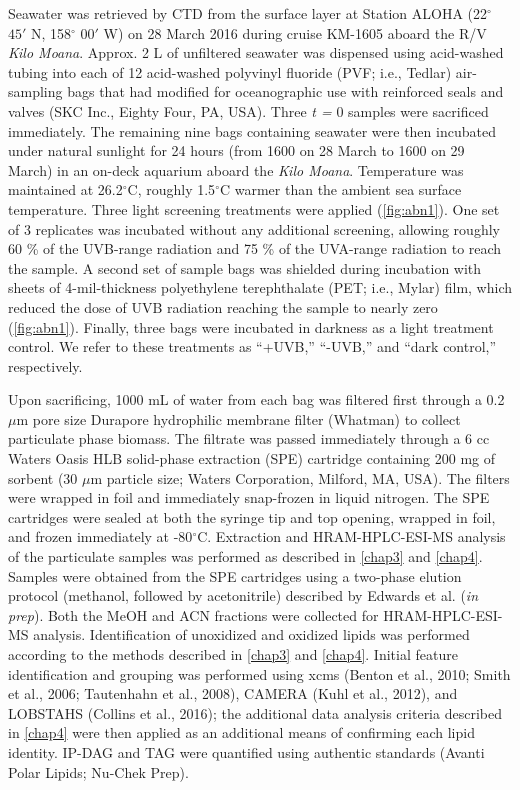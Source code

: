 Seawater was retrieved by CTD from the surface layer at Station ALOHA (22$^{\circ}$ $45'$ N, 158$^{\circ}$ $00'$ W) on 28 March 2016 during cruise KM-1605 aboard the R/V \emph{Kilo Moana}. Approx. 2 L of unfiltered seawater was dispensed using acid-washed tubing into each of 12 acid-washed polyvinyl fluoride (PVF; i.e., Tedlar) air-sampling bags that had modified for oceanographic use with reinforced seals and valves (SKC Inc., Eighty Four, PA, USA). Three \emph{t =} 0 samples were sacrificed immediately. The remaining nine bags containing seawater were then incubated under natural sunlight for 24 hours (from 1600 on 28 March to 1600 on 29 March) in an on-deck aquarium aboard the \emph{Kilo Moana}. Temperature was maintained at 26.2$^{\circ}$C, roughly 1.5$^{\circ}$C warmer than the ambient sea surface temperature. Three light screening treatments were applied (\autoref{fig:abn1}). One set of 3 replicates was incubated without any additional screening, allowing roughly 60 \% of the UVB-range radiation and 75 \% of the UVA-range radiation to reach the sample. A second set of sample bags was shielded during incubation with sheets of 4-mil-thickness polyethylene terephthalate (PET; i.e., Mylar) film, which reduced the dose of UVB radiation reaching the sample to nearly zero (\autoref{fig:abn1}). Finally, three bags were incubated in darkness as a light treatment control. We refer to these treatments as ``+UVB,'' ``-UVB,'' and ``dark control,'' respectively.

Upon sacrificing, 1000 mL of water from each bag was filtered first through a 0.2 $\mu$m pore size Durapore hydrophilic membrane filter (Whatman) to collect particulate phase biomass. The filtrate was passed immediately through a 6 cc Waters Oasis HLB solid-phase extraction (SPE) cartridge containing 200 mg of sorbent (30 $\mu$m particle size; Waters Corporation, Milford, MA, USA). The filters were wrapped in foil and immediately snap-frozen in liquid nitrogen. The SPE cartridges were sealed at both the syringe tip and top opening, wrapped in foil, and frozen immediately at -80$^{\circ}$C. Extraction and HRAM-HPLC-ESI-MS analysis of the particulate samples was performed as described in \autoref{chap3} and \autoref{chap4}. Samples were obtained from the SPE cartridges using a two-phase elution protocol (methanol, followed by acetonitrile) described by Edwards et al. (\emph{in prep}). Both the MeOH and ACN fractions were collected for HRAM-HPLC-ESI-MS analysis. Identification of unoxidized and oxidized lipids was performed according to the methods described in \autoref{chap3} and \autoref{chap4}. Initial feature identification and grouping was performed using xcms (Benton et al., 2010; Smith et al., 2006; Tautenhahn et al., 2008), CAMERA (Kuhl et al., 2012), and LOBSTAHS (Collins et al., 2016); the additional data analysis criteria described in \autoref{chap4} were then applied as an additional means of confirming each lipid identity. IP-DAG and TAG were quantified using authentic standards (Avanti Polar Lipids; Nu-Chek Prep).

